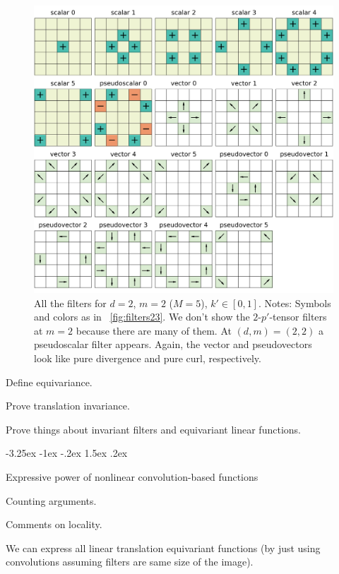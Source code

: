 \documentclass{article}
\makeatletter
\newenvironment{hoggfigure}{%
  \begin{figure}[tp]%
    \begin{mdframed}%
    \color{captiongray}}{%
    \end{mdframed}%
  \end{figure}}
\theoremstyle{plain}
\newcommand{\figref}[1]{\figurename~\ref{#1}}
\renewcommand\section{\@startsection {section}{1}{\z@}%
  {-3.25ex \@plus -1ex \@minus -.2ex}%
  {1.5ex \@plus .2ex}%
  {\raggedright\normalfont\large\bfseries}}%
\makeatother
\begin{document}
\begin{hoggfigure}
  \begin{center}
\includegraphics[width=\textwidth]{notebooks/filter_2_5.png}
  \end{center}
\caption{All the filters for $d=2$, $m=2$ ($M=5$), $k'\in [0,1]$.
Notes: Symbols and colors as in \figref{fig:filters23}.
We don't show the $2$-$p'$-tensor filters at $m=2$ because there are many of them.
At $(d,m)=(2,2)$ a pseudoscalar filter appears.
Again, the vector and pseudovectors look like pure divergence and pure curl, respectively.\label{fig:filters25}}
\end{hoggfigure}

Define equivariance.

Prove translation invariance.

Prove things about invariant filters and equivariant linear functions.


\section{Expressive power of nonlinear convolution-based functions}\label{sec:universality}

Counting arguments.

Comments on locality.

We can express all linear translation equivariant functions (by just using convolutions assuming filters are same size of the image). 
\end{document}
